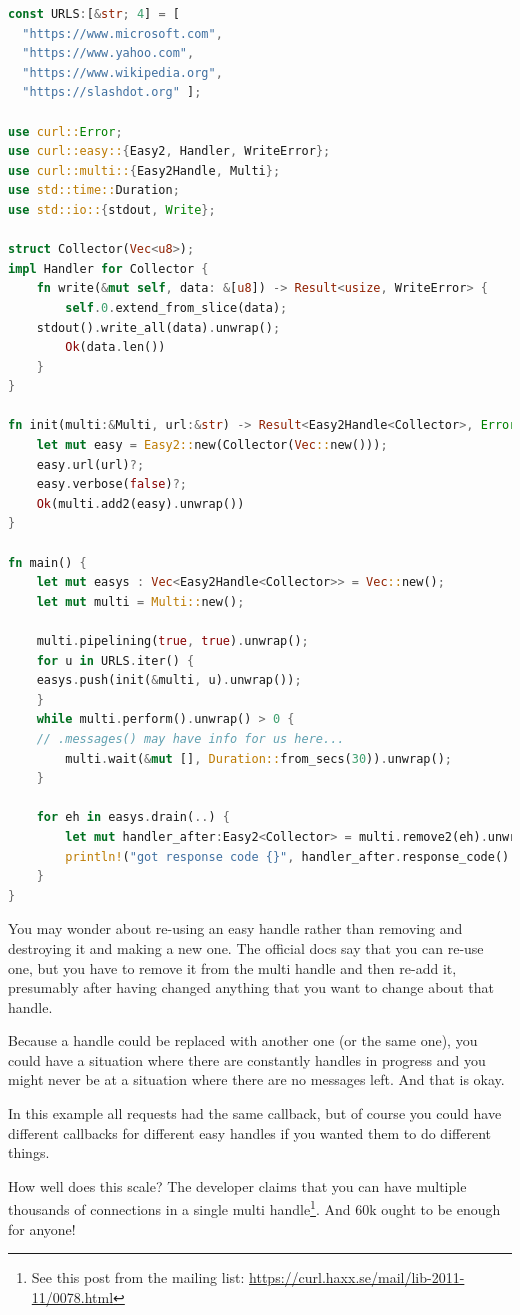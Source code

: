 \documentclass[a4paper]{report}
\begin{document}
\begin{lstlisting}[language=Rust]
const URLS:[&str; 4] = [
  "https://www.microsoft.com",
  "https://www.yahoo.com",
  "https://www.wikipedia.org",
  "https://slashdot.org" ];

use curl::Error;
use curl::easy::{Easy2, Handler, WriteError};
use curl::multi::{Easy2Handle, Multi};
use std::time::Duration;
use std::io::{stdout, Write};

struct Collector(Vec<u8>);
impl Handler for Collector {
    fn write(&mut self, data: &[u8]) -> Result<usize, WriteError> {
        self.0.extend_from_slice(data);
	stdout().write_all(data).unwrap();
        Ok(data.len())
    }
}

fn init(multi:&Multi, url:&str) -> Result<Easy2Handle<Collector>, Error> {
    let mut easy = Easy2::new(Collector(Vec::new()));
    easy.url(url)?;
    easy.verbose(false)?;
    Ok(multi.add2(easy).unwrap())
}

fn main() {
    let mut easys : Vec<Easy2Handle<Collector>> = Vec::new();
    let mut multi = Multi::new();
    
    multi.pipelining(true, true).unwrap();
    for u in URLS.iter() {
	easys.push(init(&multi, u).unwrap());
    }
    while multi.perform().unwrap() > 0 {
	// .messages() may have info for us here...
        multi.wait(&mut [], Duration::from_secs(30)).unwrap();
    }

    for eh in easys.drain(..) {
    	let mut handler_after:Easy2<Collector> = multi.remove2(eh).unwrap();
        println!("got response code {}", handler_after.response_code().unwrap());
    }
}
\end{lstlisting}

You may wonder about re-using an easy handle rather than removing and destroying it and making a new one. The official docs say that you can re-use one, but you have to remove it from the multi handle and then re-add it, presumably after having changed anything that you want to change about that handle. 

Because a handle could be replaced with another one (or the same one), you could have a situation where there are constantly handles in progress and you might never be at a situation where there are no messages left. And that is okay.

In this example all requests had the same callback, but of course you could have different callbacks for different easy handles if you wanted them to do different things.

How well does this scale? The developer claims that you can have multiple thousands of connections in a single multi handle\footnote{See this post from the mailing list: \url{https://curl.haxx.se/mail/lib-2011-11/0078.html}}. And 60k ought to be enough for anyone!
\end{document}
